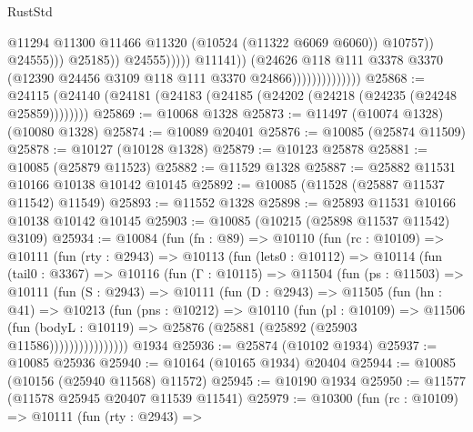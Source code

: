 \begin{lexlean}{RustStd}
\begin{coremodule}
                                                        @11294
                                                        @11300
                                                        @11466
                                                        @11320
                                                        (@10524 (@11322 @6069 @6060))
                                                        @10757))
                                                    @24555)))
                                              @25185))
                                          @24555)))))
                                @11141))
                            (@24626
                              @118
                              @111
                              @3378
                              @3370
                              (@12390 @24456 @3109 @118 @111 @3370 @24866))))))))))))))
@25868 := @24115 (@24140 (@24181 (@24183 (@24185 (@24202 (@24218 (@24235 (@24248 @25859))))))))
@25869 := @10068 @1328
@25873 := @11497 (@10074 @1328) (@10080 @1328)
@25874 := @10089 @20401
@25876 := @10085 (@25874 @11509)
@25878 := @10127 (@10128 @1328)
@25879 := @10123 @25878
@25881 := @10085 (@25879 @11523)
@25882 := @11529 @1328
@25887 := @25882 @11531 @10166 @10138 @10142 @10145
@25892 := @10085 (@11528 (@25887 @11537 @11542) @11549)
@25893 := @11552 @1328
@25898 := @25893 @11531 @10166 @10138 @10142 @10145
@25903 := @10085 (@10215 (@25898 @11537 @11542) @3109)
@25934 := @10084
    (fun (fn : @89) =>
    @10110
      (fun (rc : @10109) =>
      @10111
        (fun (rty : @2943) =>
        @10113
          (fun (lets0 : @10112) =>
          @10114
            (fun (tail0 : @3367) =>
            @10116
              (fun (Γ : @10115) =>
              @11504
                (fun (ps : @11503) =>
                @10111
                  (fun (S : @2943) =>
                  @10111
                    (fun (D : @2943) =>
                    @11505
                      (fun (hn : @41) =>
                      @10213
                        (fun (pns : @10212) =>
                        @10110
                          (fun (pl : @10109) =>
                          @11506
                            (fun (bodyL : @10119) =>
                            @25876 (@25881 (@25892 (@25903 @11586))))))))))))))))
    @1934
@25936 := @25874 (@10102 @1934)
@25937 := @10085 @25936
@25940 := @10164 (@10165 @1934) @20404
@25944 := @10085 (@10156 (@25940 @11568) @11572)
@25945 := @10190 @1934
@25950 := @11577 (@11578 @25945 @20407 @11539 @11541)
@25979 := @10300
    (fun (rc : @10109) =>
    @10111
      (fun (rty : @2943) =>

\end{coremodule}
\end{lexlean}

